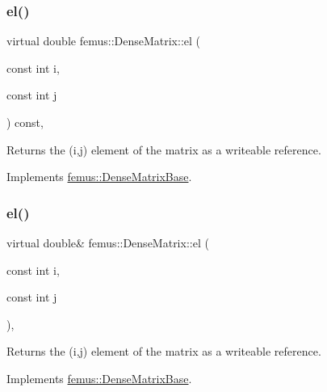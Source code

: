 \subsubsection{\texorpdfstring{el()}{el()}\hspace{0.1cm}{\footnotesize\ttfamily [1/2]}}
{\footnotesize\ttfamily virtual double femus\+::\+Dense\+Matrix\+::el (\begin{DoxyParamCaption}\item[{const int}]{i,  }\item[{const int}]{j }\end{DoxyParamCaption}) const\hspace{0.3cm}{\ttfamily [inline]}, {\ttfamily [virtual]}}

\begin{DoxyReturn}{Returns}
the {\ttfamily }(i,j) element of the matrix as a writeable reference. 
\end{DoxyReturn}


Implements \mbox{\hyperlink{classfemus_1_1_dense_matrix_base_abaf98d937069f9df0829353d9454ad93}{femus\+::\+Dense\+Matrix\+Base}}.

\mbox{\label{classfemus_1_1_dense_matrix_a9867b5e9b16b8ec746ebde4270239248}} 
\subsubsection{\texorpdfstring{el()}{el()}\hspace{0.1cm}{\footnotesize\ttfamily [2/2]}}
{\footnotesize\ttfamily virtual double\& femus\+::\+Dense\+Matrix\+::el (\begin{DoxyParamCaption}\item[{const int}]{i,  }\item[{const int}]{j }\end{DoxyParamCaption})\hspace{0.3cm}{\ttfamily [inline]}, {\ttfamily [virtual]}}

\begin{DoxyReturn}{Returns}
the {\ttfamily }(i,j) element of the matrix as a writeable reference. 
\end{DoxyReturn}


Implements \mbox{\hyperlink{classfemus_1_1_dense_matrix_base_ab1f58e98ca5000e197fce3013a019dc4}{femus\+::\+Dense\+Matrix\+Base}}.

